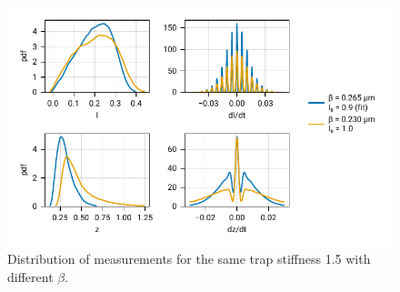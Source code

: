 \documentclass[
    twoside=false,
    twocolumn=true,
    fontsize=11pt,
]{scrarticle}
\begin{document}
\begin{figure}
    \centering
    \includegraphics{figures/02_04_02_hist.pdf}
    \caption{Distribution of measurements for the same trap stiffness \SI{1.5}{} with different $\beta$.}
\end{figure}
\end{document}
